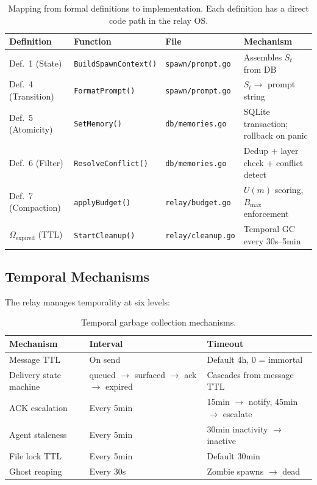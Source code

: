 \documentclass{article}
\begin{document}
\begin{table}[h]
\centering
\caption{Mapping from formal definitions to implementation. Each definition has a direct code path in the relay OS.}
\begin{tabular}{@{}llll@{}}
\toprule
\textbf{Definition} & \textbf{Function} & \textbf{File} & \textbf{Mechanism} \\
\midrule
Def.~1 (State) & \texttt{BuildSpawnContext()} & \texttt{spawn/prompt.go} & Assembles $S_t$ from DB \\
Def.~4 (Transition) & \texttt{FormatPrompt()} & \texttt{spawn/prompt.go} & $S_t \to$ prompt string \\
Def.~5 (Atomicity) & \texttt{SetMemory()} & \texttt{db/memories.go} & SQLite transaction; rollback on panic \\
Def.~6 (Filter) & \texttt{ResolveConflict()} & \texttt{db/memories.go} & Dedup + layer check + conflict detect \\
Def.~7 (Compaction) & \texttt{applyBudget()} & \texttt{relay/budget.go} & $U(m)$ scoring, $B_{\max}$ enforcement \\
$\Omega_{\text{expired}}$ (TTL) & \texttt{StartCleanup()} & \texttt{relay/cleanup.go} & Temporal GC every 30s--5min \\
\bottomrule
\end{tabular}
\end{table}

\subsection{Temporal Mechanisms}

The relay manages temporality at six levels:

\begin{table}[h]
\centering
\caption{Temporal garbage collection mechanisms.}
\begin{tabular}{@{}lll@{}}
\toprule
\textbf{Mechanism} & \textbf{Interval} & \textbf{Timeout} \\
\midrule
Message TTL & On send & Default 4h, 0 = immortal \\
Delivery state machine & queued $\to$ surfaced $\to$ ack $\to$ expired & Cascades from message TTL \\
ACK escalation & Every 5min & 15min $\to$ notify, 45min $\to$ escalate \\
Agent staleness & Every 5min & 30min inactivity $\to$ inactive \\
File lock TTL & Every 5min & Default 30min \\
Ghost reaping & Every 30s & Zombie spawns $\to$ dead \\
\bottomrule
\end{tabular}
\end{table}
\end{document}
